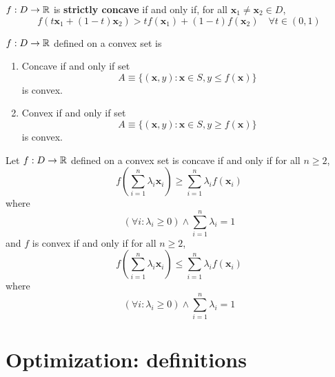 \documentclass{article}
\begin{document}
		\begin{definition}
			$f: D \to \mathbb{R}$ is \textbf{strictly concave} if and only if, for all $\textbf{x}_1 \neq \textbf{x}_2 \in D$,
			\[
				f(t \textbf{x}_1 + (1-t) \textbf{x}_2) > t f(\textbf{x}_1) + (1-t) f(\textbf{x}_2)\quad \forall t \in (0, 1)
			\]
		\end{definition}
		
		\begin{theorem}
			$f: D \to \mathbb{R}$ defined on a convex set is 
			\begin{enumerate}
				\item Concave if and only if set 
				\[
					A \equiv \{(\textbf{x}, y): \textbf{x} \in S, y \leq f(\textbf{x})\}
				\]
				is convex. 
				\item Convex if and only if set 
				\[
					A \equiv \{(\textbf{x}, y): \textbf{x} \in S, y \geq f(\textbf{x})\}
				\]
				is convex.
			\end{enumerate}
		\end{theorem}
		
		\begin{theorem}
			Let $f: D \to \mathbb{R}$ defined on a convex set is concave if and only if for all $n \geq 2$,
			\[
				f(\sum_{i=1}^n \lambda_i \textbf{x}_i) \geq \sum_{i=1}^n \lambda_i f(\textbf{x}_i)
			\]
			where 
			\[
				(\forall i: \lambda_i \geq 0) \land \sum_{i=1}^n \lambda_i = 1
			\]
			and $f$ is convex if and only if for all $n \geq 2$,
			\[
				f(\sum_{i=1}^n \lambda_i \textbf{x}_i) \leq \sum_{i=1}^n \lambda_i f(\textbf{x}_i)
			\]
			where 
			\[
				(\forall i: \lambda_i \geq 0) \land \sum_{i=1}^n \lambda_i = 1
			\]
		\end{theorem}
		
	\section{Optimization: definitions}
\end{document}
